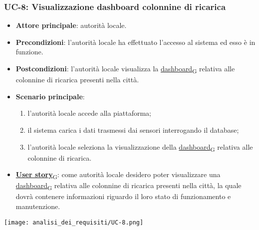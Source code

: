 \subsubsection{UC-8: Visualizzazione dashboard colonnine di ricarica}
\begin{itemize}
	\item \textbf{Attore principale}: autorità locale.
	\item \textbf{Precondizioni}: l'autorità locale ha effettuato l'accesso al sistema ed esso è in funzione.
	\item \textbf{Postcondizioni}: l'autorità locale visualizza la \href{https://7last.github.io/docs/rtb/documentazione-interna/glossario\#dashboard}{dashboard\textsubscript{G}} relativa
	      alle colonnine di ricarica presenti nella città.
	\item \textbf{Scenario principale}:
	      \begin{enumerate}
		      \item l'autorità locale accede alla piattaforma;
		      \item il sistema carica i dati trasmessi dai sensori interrogando il database;
		      \item l'autorità locale seleziona la visualizzazione della \href{https://7last.github.io/docs/rtb/documentazione-interna/glossario\#dashboard}{dashboard\textsubscript{G}} relativa alle colonnine di ricarica.
	      \end{enumerate}
	\item \href{https://7last.github.io/docs/rtb/documentazione-interna/glossario\#user-story}{\textbf{User story}\textsubscript{G}}:
	      come autorità locale desidero poter visualizzare una \href{https://7last.github.io/docs/rtb/documentazione-interna/glossario\#dashboard}{dashboard\textsubscript{G}} relativa alle colonnine di ricarica presenti nella città, la quale
	      dovrà contenere informazioni riguardo il loro stato di funzionamento e manutenzione.
\end{itemize}
\begin{center}
	\texttt{[image: analisi\_dei\_requisiti/UC-8.png]}
\end{center}

\newpage

